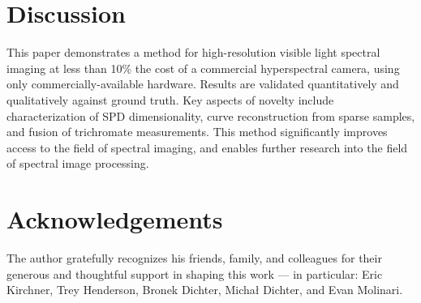 \documentclass[twocolumn,10pt]{asme2ej}
\newcommand{\id}{\hspace{6 mm}}
\begin{document}

\clearpage
\twocolumn

\section{Discussion}

This paper demonstrates a method for high-resolution visible light spectral imaging at less than 10\% the cost of a commercial hyperspectral camera, using only commercially-available hardware. Results are validated quantitatively and qualitatively against ground truth. Key aspects of novelty include characterization of SPD dimensionality, curve reconstruction from sparse samples, and fusion of trichromate measurements. This method significantly improves access to the field of spectral imaging, and enables further research into the field of spectral image processing.


%

\section{Acknowledgements}

The author gratefully recognizes his friends, family, and colleagues for their generous and thoughtful support in shaping this work --- in particular: Eric Kirchner, Trey Henderson, Bronek Dichter, Michał Dichter, and Evan Molinari.

\end{document}
